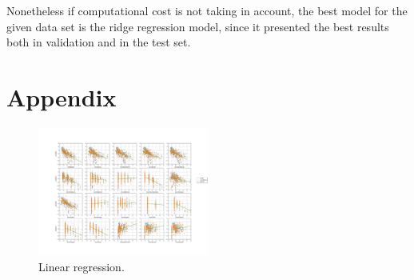 Nonetheless if computational cost is not taking in account, the best model for the given data set is the ridge regression model, since it presented the best results both in validation and in the test set.


\section*{Appendix}
\begin{figure}[htbp!]
  \centerline{\includegraphics[width=0.5\textwidth]{../../code/hw2/figures/2-linear-regression.pdf}}
  \caption{Linear regression.}
  \label{fig:2-linear-regression}
\end{figure}

